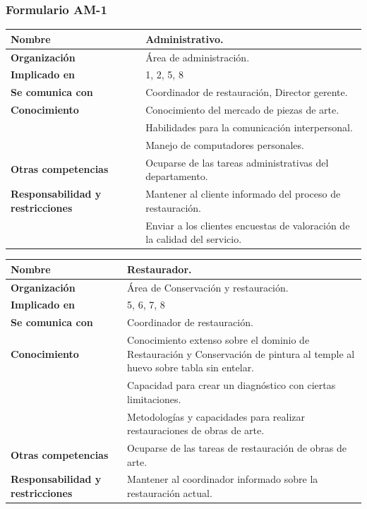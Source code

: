 \documentclass[a4paper,11pt]{article}
\begin{document}
			\subsubsection{Formulario AM-1}
			\begin{center}
				\begin{tabular}{| l | p{5.5cm} |}
					\hline
					\textbf{Nombre} & Administrativo.\\
					\hline
					\textbf{Organización} & Área de administración.\\
					\hline
					\textbf{Implicado en} & 1, 2, 5, 8\\
					\hline
					\textbf{Se comunica con} & Coordinador de restauración, Director gerente.\\
					\hline
					\textbf{Conocimiento} & Conocimiento del mercado de piezas de arte.\\
					& Habilidades para la comunicación interpersonal.\\
					& Manejo de computadores personales.\\
					\hline
					\textbf{Otras competencias} & Ocuparse de las tareas administrativas del
					departamento.\\
					\hline
					\textbf{Responsabilidad y restricciones} & Mantener al cliente informado del proceso de restauración.\\
					& Enviar a los clientes encuestas de valoración de la calidad del
					servicio.\\
					\hline
				\end{tabular}
			\end{center}
			\begin{center}
				\begin{tabular}{| l | p{5.5cm} |}
					\hline
					\textbf{Nombre} & Restaurador.\\
					\hline
					\textbf{Organización} & Área de Conservación y restauración.\\
					\hline
					\textbf{Implicado en} & 5, 6, 7, 8\\
					\hline
					\textbf{Se comunica con} & Coordinador de restauración.\\
					\hline
					\textbf{Conocimiento} & Conocimiento extenso sobre el dominio de
					Restauración y Conservación de pintura al temple al huevo sobre tabla sin entelar.\\
					& Capacidad para crear un diagnóstico con ciertas limitaciones.\\
					& Metodologías y capacidades para realizar restauraciones de obras de arte.\\
					\hline
					\textbf{Otras competencias} & Ocuparse de las tareas de restauración de
					obras de arte.\\
					\hline
					\textbf{Responsabilidad y restricciones} & Mantener al coordinador
					informado sobre la restauración actual.\\
					\hline
				\end{tabular}
			\end{center}
\end{document}
